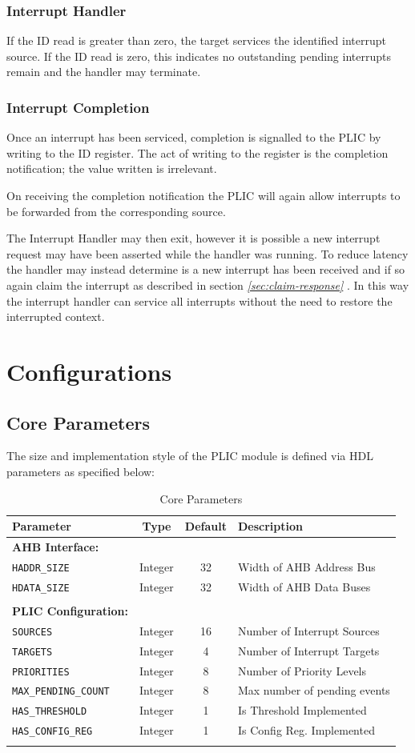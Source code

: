 \documentclass[]{article}
\begin{document}
\subsubsection{Interrupt Handler}

If the ID read is greater than zero, the target services the identified
interrupt source. If the ID read is zero, this indicates no outstanding
pending interrupts remain and the handler may terminate.

\subsubsection{Interrupt Completion}

Once an interrupt has been serviced, completion is signalled to the PLIC
by writing to the ID register. The act of writing to the register is the
completion notification; the value written is irrelevant.

On receiving the completion notification the PLIC will again allow
interrupts to be forwarded from the corresponding source.

The Interrupt Handler may then exit, however it is possible a new
interrupt request may have been asserted while the handler was running.
To reduce latency the handler may instead determine is a new interrupt
has been received and if so again claim the interrupt as described in
section \emph{\ref{sec:claim-response} }. In this
way the interrupt handler can service all interrupts without the need to
restore the interrupted context.

\section{Configurations}

\subsection{Core Parameters}

The size and implementation style of the PLIC module is defined via HDL
parameters as specified below:

\begin{longtable}[]{@{}lccl@{}}
\toprule
\textbf{Parameter} & \textbf{Type} & \textbf{Default} & \textbf{Description}\tabularnewline
\midrule
\endhead
\textbf{AHB Interface:} & & &\tabularnewline
\texttt{HADDR\_SIZE} & Integer & 32 & Width of AHB Address Bus\tabularnewline
\texttt{HDATA\_SIZE} & Integer & 32 & Width of AHB Data Buses\tabularnewline
& & &\tabularnewline
\textbf{PLIC Configuration:} & & &\tabularnewline
\texttt{SOURCES} & Integer & 16 & Number of Interrupt Sources\tabularnewline
\texttt{TARGETS} & Integer & 4 & Number of Interrupt Targets\tabularnewline
\texttt{PRIORITIES} & Integer & 8 & Number of Priority Levels\tabularnewline
\texttt{MAX\_PENDING\_COUNT} & Integer & 8 & Max number of pending events\tabularnewline
\texttt{HAS\_THRESHOLD} & Integer & 1 & Is Threshold Implemented\tabularnewline
\texttt{HAS\_CONFIG\_REG} & Integer & 1 & Is Config Reg. Implemented\tabularnewline
\bottomrule
\caption{Core Parameters}
\label{tab:CoreParams}
\end{longtable}
\end{document}
